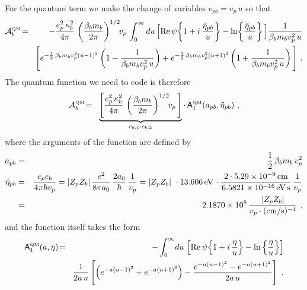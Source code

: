 \documentclass[preprint,12pt,eqsecnum,nofootinbib,amsmath,amssymb]{revtex4}
\newcommand{\smQM}{{\rm\scriptscriptstyle QM}}
\begin{document}
{{For the quantum term we make the change of variables
$v_{pb}= v_p\,u$ so that
\begin{eqnarray}
  {\cal A}^\smQM_b
  &\!=\!&  
  -\frac{e_p^2\, \kappa_b^2}{4\pi}\,
  \left( \frac{\beta_b m_b}{2\pi} \right)^{1/2} \!\! v_p\,
  \int_0^\infty du\, 
  \Big[{\rm Re}\,\psi\!\left\{ 1 + i\, \frac{\bar\eta_{pb}}{u}
  \right\}
  - \ln\!\left\{\frac{\bar\eta_{pb}}{u} \right\} \Big] 
  \frac{1}{\beta_b m_b v_p^2\,u}
\nonumber
\\ &&
  \Bigg[ e^{-\frac{1}{2}\,\beta_b m_b v_p^2 (u-1)^2} 
  \left(1 - \frac{1}{\beta_b m_b v_p^2\, u}\right) +
  e^{-\frac{1}{2}\,\beta_b m_b v_p^2 (u+1)^2}  
  \left(1 + \frac{1}{\beta_b m_b v_p^2\, u}\right)
  \Bigg] \ .
\end{eqnarray}
The quantum function we need to code is therefore
\begin{eqnarray}
  {\cal A}^\smQM_b
  &\!=\!&  
  \underbrace{
  \left[\frac{e_p^2\, \kappa_b^2}{4\pi}\,
  \left( \frac{\beta_b m_b}{2\pi} \right)^{1/2} \!\! v_p\,
  \right] 
  }_{c_{b, 1} \cdot c_{b, 2}}
  \cdot \,
  {\sf A}_1^\smQM(a_{pb}, \tilde\eta_{pb}) \ ,
\label{qmA}
\end{eqnarray}
where the arguments of the function are defined by 
\begin{eqnarray}
  a_{pb} 
  &=& 
  \frac{1}{2}\,\beta_b m_b\, v_p^2
\\
  \tilde\eta_{pb}
  &=& 
  \frac{e_p e_b}{4 \pi \hbar v_p}
  =
  \vert Z_p Z_b\vert\,\frac{e^2}{8 \pi a_0}\,\frac{2 a_0}{\hbar}\,
  \frac{1}{v_p}
  =
  \vert Z_p Z_b\vert\ \cdot 13.606\,{\rm eV}\,\cdot
  \frac{2 \cdot 5.29 \times 10^{-9}\,{\rm cm}}{6.5821 \times
  10^{-16}\,{\rm eV\,s}}\,
  \frac{1}{v_p}
\nonumber
\\
  &=&
  2.1870 \times 10^8 \, \frac{\vert Z_p Z_b\vert}{v_p
  \cdot ({\rm cm/s})^{-1}} \ ,
\end{eqnarray}
and the function itself takes the form
\begin{eqnarray}
  {\sf A}_1^\smQM(a,\eta)
  &\!=\!&  
  -\int_0^\infty \! du\, 
  \left[{\rm Re}\,\psi\! \left\{1 + i\, \frac{\eta}{u} \right\} - 
  \ln\left\{ \frac{\eta}{u}  \right\} \right]
\nonumber
\\ && 
  \frac{1}{2 a\,u}\left[\left(e^{-a(u-1)^2} + e^{-a(u+1)^2} \right) 
  - \frac{e^{-a(u-1)^2} - e^{-a(u+1)^2} } {2 a\, u}\right] \ .
\label{qmAB}
\end{eqnarray}


}}
\end{document}
